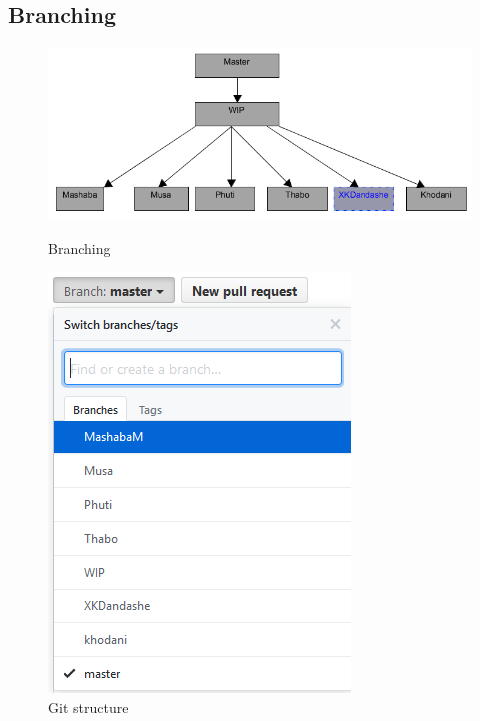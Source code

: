 \documentclass[english]{article}
\begin{document}
\subsection{Branching}		

\begin{figure}[!htb]
  \includegraphics[width=\linewidth]{Branching.png}
  \caption{Branching}\label{Branching}
\endminipage\hfill
{}
  \includegraphics[width=\linewidth]{GitStructure.png}
  \caption{Git structure}\label{Git structure}
\endminipage\hfill
\end{figure}
\end{document}
